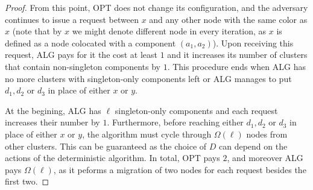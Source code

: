 \begin{proof}
From this point, OPT does not change its configuration, and the adversary continues to issue a request between $x$ and any other node with the same color as $x$
(note that by $x$ we might denote different node in every iteration, as $x$ is defined as a node colocated with a component $(a_1, a_2)$).
Upon receiving this request, ALG pays for it the cost at least $1$ and it increases its number of clusters that contain non-singleton components by $1$.
This procedure ends when ALG has no more clusters with singleton-only components left or ALG manages to put $d_1, d_2$ or $d_3$ in place of either $x$ or $y$.

At the begining, ALG has $\ell$ singleton-only components and each request increases their number by $1$.
Furthermore, before reaching either $d_1, d_2$ or $d_3$ in place of either $x$ or $y$, the algorithm must cycle through $\Omega(\ell)$ nodes from other clusters. This can be guaranteed as the choice of $D$ can depend on the actions of the deterministic algorithm.
In total, OPT pays $2$, and moreover ALG pays $\Omega(\ell)$, as it peforms a migration of two nodes for each request besides the first two.





\end{proof}

